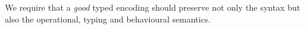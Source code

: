 %

We require that a {\em good} typed encoding should 
preserve not only the syntax but
also the operational, typing and behavioural
semantics. 


